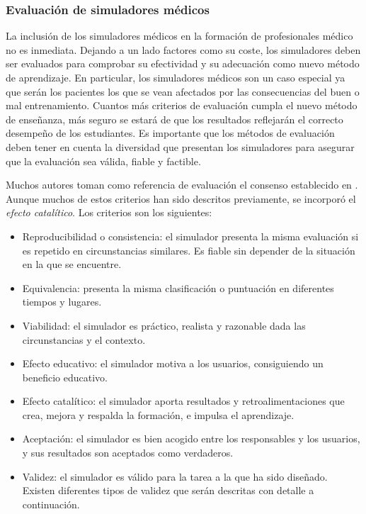 



\subsubsection{Evaluación de simuladores médicos}
\label{art:evaluation}

La inclusión de los simuladores médicos en la formación de profesionales médico no es inmediata. Dejando a un lado factores como su coste, los simuladores deben ser evaluados para comprobar su efectividad y su adecuación como nuevo método de aprendizaje. En particular, los simuladores médicos son un caso especial ya que serán los pacientes los que se vean afectados por las consecuencias del buen o mal entrenamiento. Cuantos más criterios de evaluación cumpla el nuevo método de enseñanza, más seguro se estará de que los resultados reflejarán el correcto desempeño de los estudiantes.
Es importante que los métodos de evaluación deben tener en cuenta la diversidad que presentan los simuladores para asegurar que la evaluación sea válida, fiable y factible. 

Muchos autores toman como referencia de evaluación el consenso establecido en  \cite{norcini2011criteria}. Aunque muchos de estos criterios han sido descritos previamente, se incorporó el  \emph{efecto catalítico}. Los criterios son los siguientes:

\begin{itemize}

\item Reproducibilidad o consistencia: el simulador presenta la misma evaluación si es repetido en circunstancias similares. Es fiable sin depender de la situación en la que se encuentre.
\item Equivalencia: presenta la misma clasificación o puntuación en diferentes tiempos y lugares.%
\item Viabilidad: el simulador es práctico, realista y razonable dada las circunstancias y el contexto.
\item Efecto educativo: el simulador motiva a los usuarios, consiguiendo un beneficio educativo.
\item Efecto catalítico: el simulador aporta resultados y retroalimentaciones que crea, mejora y respalda la formación, e impulsa el aprendizaje.
\item Aceptación: el simulador es bien acogido entre los responsables y los usuarios, y sus resultados son aceptados como verdaderos.
\item Validez: el simulador es válido para la tarea a la que ha sido diseñado. Existen diferentes tipos de validez que serán descritas con detalle a continuación.
\end{itemize}




